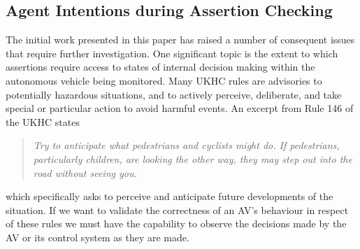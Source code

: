 \subsection{Agent Intentions during Assertion Checking}
The initial work presented in this paper has raised a number of consequent issues that require further investigation. One significant topic is the extent to which assertions require access to states of internal decision making within the autonomous vehicle being monitored. Many UKHC rules are advisories to %
potentially hazardous situations, and to actively perceive, deliberate, and take special or particular action to avoid harmful events. 
% 
An excerpt from Rule 146 of the UKHC states \begin{quote} \textit{Try to anticipate what pedestrians and cyclists might do. If pedestrians, particularly children, are looking the other way, they may step out into the road without seeing you.} \end{quote} which specifically asks to perceive and anticipate future developments of the situation. If we want to validate the correctness of an AV's behaviour in respect of these rules we must have the capability to observe the decisions made by the AV or its control system as they are made. 






